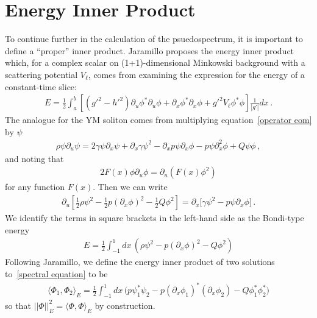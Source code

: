 \documentclass[11pt,letterpaper]{article}
\newcommand{\p}{\partial}
\begin{document}

\section{Energy Inner Product}
To continue further in the calculation of the psuedospectrum, it is important to define a ``proper'' inner product. Jaramillo proposes the energy inner product which, for a complex scalar on (1+1)-dimensional Minkowski background with a scattering potential $V_\ell$, comes from examining the expression for the energy of a constant-time slice:
	\begin{align}
		\label{scalar energy}
		E = \frac{1}{2}\int^b_a \left[ (g'^2 - h'^2) \p_u \phi^* \p_u \phi + \p_x \phi^* \p_x \phi + g'^2 V_{\ell} \phi^* \phi \right] \frac{1}{|g'|} dx \, .
	\end{align}
The analogue for the YM soliton comes from multiplying equation~\eqref{operator eom} by $\psi$
	\begin{align}
		\rho \psi \p_u \psi = 2 \gamma \psi \p_x \psi + \p_x \gamma \psi^2 - \p_x p \psi \p_x \phi - p \psi \p^2_x \phi + Q\psi \phi \, ,
	\end{align} 
and noting that
	\begin{align}
		2 F(x) \phi \p_u \phi = \p_u \left(F(x) \phi^2 \right)
	\end{align}
for any function $F(x)$. Then we can write
	\begin{align}
		\p_u \left[ \frac{1}{2} \rho \psi^2 - \frac{1}{2} p \left( \p_x \phi \right)^2 - \frac{1}{2} Q \phi^2 \right] = \p_x \Big[ \gamma \psi^2 - p \psi \p_x \phi \Big] \, .
	\end{align}
We identify the terms in square brackets in the left-hand side as the Bondi-type energy
	\begin{align}
		\label{Bondi energy}
		E = \frac{1}{2} \int^1_{-1} dx \, \left( \rho \psi^2 - p \left( \p_x \phi \right)^2 - Q \phi^2 \right)
	\end{align}
Following Jaramillo, we define the energy inner product of two solutions to~\eqref{spectral equation} to be
	\begin{align}
		\label{energy product}
		\langle \Phi_1, \Phi_2 \rangle_E = \frac{1}{2} \int^1_{-1} dx \, \Big( p \psi_1^* \psi_2 - p (\p_x \phi_1)^* (\p_x \phi_2) - Q \phi_1^* \phi_2^* \Big)
	\end{align}
so that $||\Phi||^2_E = \langle \Phi, \Phi \rangle_E$ by construction.
\end{document}

